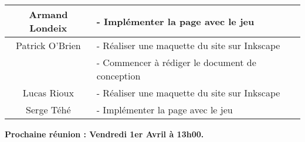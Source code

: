 \begin{center}
\begin{tabular}{|c|l|}
    \hline
    Armand Londeix & - Implémenter la page avec le jeu \\
    \hline
    Patrick O'Brien & - Réaliser une maquette du site sur Inkscape \\ 
    & - Commencer à rédiger le document de conception \\
   \hline
    Lucas Rioux & - Réaliser une maquette du site sur Inkscape \\
    \hline
    Serge Téhé & - Implémenter la page avec le jeu\\
    \hline
\end{tabular}
\end{center}

\tabto{0cm}\textbf{Prochaine réunion : Vendredi 1er Avril à 13h00.}